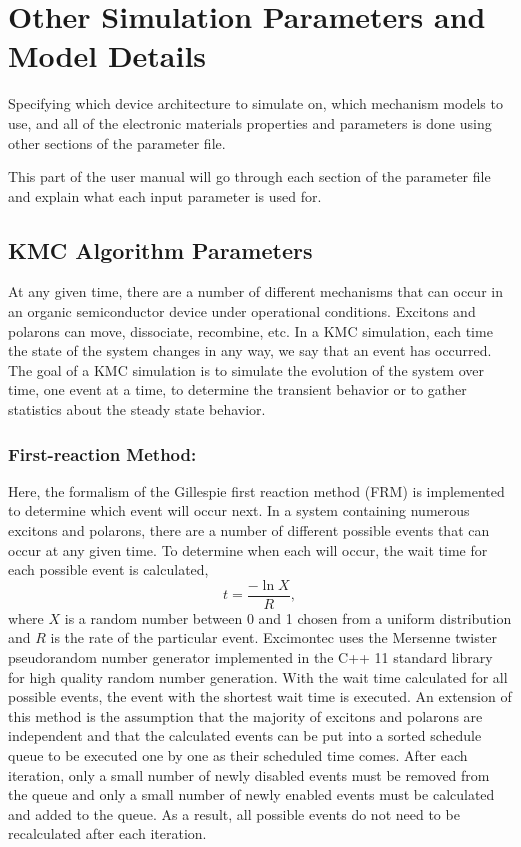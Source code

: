 \documentclass[%
 reprint,onecolumn,notitlepage,
superscriptaddress,longbibliography,
 amsmath,amssymb,
 aps,rmp,floatfix,
]{revtex4-1}
\begin{document}
\section{Other Simulation Parameters and Model Details}

Specifying which device architecture to simulate on, which mechanism models to use, and all of the electronic materials properties and parameters is done using other sections of the parameter file.

This part of the user manual will go through each section of the parameter file and explain what each input parameter is used for.

\subsection{KMC Algorithm Parameters}\label{sub:KMC_algorithms}

At any given time, there are a number of different mechanisms that can occur in an organic semiconductor device under operational conditions. 
Excitons and polarons can move, dissociate, recombine, etc. 
In a KMC simulation, each time the state of the system changes in any way, we say that an event has occurred. The goal of a KMC simulation is to simulate the evolution of the system over time, one event at a time, to determine the transient behavior or to gather statistics about the steady state behavior.

\subsubsection{First-reaction Method:}

Here, the formalism of the Gillespie first reaction method (FRM) is implemented to determine which event will occur next.\cite{gillespie1976jcp} 
In a system containing numerous excitons and polarons, there are a number of different possible events that can occur at any given time. 
To determine when each will occur, the wait time for each possible event is calculated,
$$t = \frac{-\ln{X}}{R},$$
where $X$ is a random number between 0 and 1 chosen from a uniform distribution and $R$ is the rate of the particular event. 
Excimontec uses the Mersenne twister pseudorandom number generator implemented in the C++ 11 standard library for high quality random number generation.
With the wait time calculated for all possible events, the event with the shortest wait time is executed. 
An extension of this method is the assumption that the majority of excitons and polarons are independent and that the calculated events can be put into a sorted schedule queue to be executed one by one as their scheduled time comes. 
After each iteration, only a small number of newly disabled events must be removed from the queue and only a small number of newly enabled events must be calculated and added to the queue. 
As a result, all possible events do not need to be recalculated after each iteration.
\end{document}
